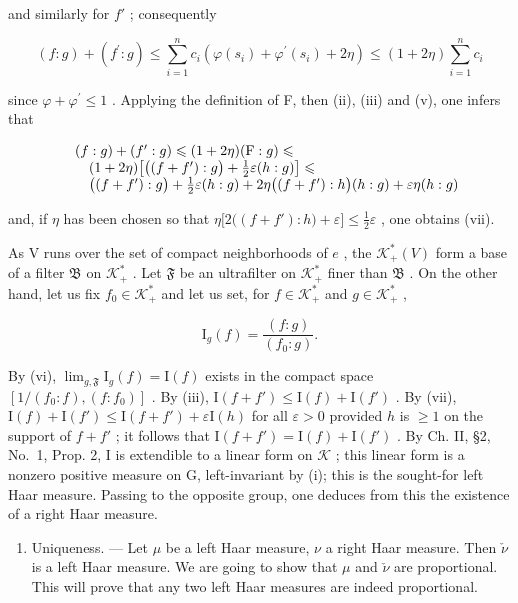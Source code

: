 and similarly for \(f'\) ; consequently

\[
(f: g) + (f ^ {\prime}: g) \leqslant \sum_ {i = 1} ^ {n} c _ {i} (\varphi (s _ {i}) + \varphi^ {\prime} (s _ {i}) + 2 \eta) \leqslant (1 + 2 \eta) \sum_ {i = 1} ^ {n} c _ {i}
\]

since \(\varphi +\varphi^{\prime}\leqslant 1\) . Applying the definition of F, then (ii), (iii) and (v), one infers that

\[
\begin{array}{r l} & {(f: g) + (f ^ {\prime}: g) \leqslant (1 + 2 \eta) (\mathrm{F}: g) \leqslant} \\ & {\quad (1 + 2 \eta) \big [ \big ((f + f ^ {\prime}): g \big) + \frac {1}{2} \varepsilon (h: g) \big ] \leqslant} \\ & {\quad \big ((f + f ^ {\prime}): g \big) + \frac {1}{2} \varepsilon (h: g) + 2 \eta \big ((f + f ^ {\prime}): h \big) (h: g) + \varepsilon \eta (h: g)} \end{array}
\]

and, if \(\eta\) has been chosen so that \(\eta\big[2\big((f + f'):h\big) + \varepsilon\big] \leqslant \frac{1}{2}\varepsilon\) , one obtains (vii).

As V runs over the set of compact neighborhoods of \(e\) , the \(\mathcal{K}_{+}^{*}(V)\) form a base of a filter \(\mathfrak{B}\) on \(\mathcal{K}_{+}^{*}\) . Let \(\mathfrak{F}\) be an ultrafilter on \(\mathcal{K}_{+}^{*}\) finer than \(\mathfrak{B}\) . On the other hand, let us fix \(f_{0} \in \mathcal{K}_{+}^{*}\) and let us set, for \(f \in \mathcal{K}_{+}^{*}\) and \(g \in \mathcal{K}_{+}^{*}\) ,

\[
\mathrm{I} _ {g} (f) = \frac {(f : g)}{(f _ {0} : g)}.
\]

By (vi), \(\lim_{g,\mathfrak{F}}\mathrm{I}_g(f) = \mathrm{I}(f)\) exists in the compact space \([1 / (f_0:f),(f:f_0)]\) . By (iii), \(\mathrm{I}(f + f')\leqslant \mathrm{I}(f) + \mathrm{I}(f')\) . By (vii), \(\mathrm{I}(f) + \mathrm{I}(f')\leqslant \mathrm{I}(f + f') + \varepsilon \mathrm{I}(h)\) for all \(\varepsilon >0\) provided \(h\) is \(\geqslant 1\) on the support of \(f + f'\) ; it follows that \(\mathrm{I}(f + f') = \mathrm{I}(f) + \mathrm{I}(f')\) . By Ch. II, §2, No.~1, Prop. 2, I is extendible to a linear form on \(\mathcal{K}\) ; this linear form is a nonzero positive measure on G, left-invariant by (i); this is the sought-for left Haar measure. Passing to the opposite group, one deduces from this the existence of a right Haar measure.

\begin{enumerate}
\def\labelenumi{\Alph{enumi})}
\setcounter{enumi}{1}
\tightlist
\item
  Uniqueness. --- Let \(\mu\) be a left Haar measure, \(\nu\) a right Haar measure. Then \(\check{\nu}\) is a left Haar measure. We are going to show that \(\mu\) and \(\check{\nu}\) are proportional. This will prove that any two left Haar measures are indeed proportional.
\end{enumerate}

